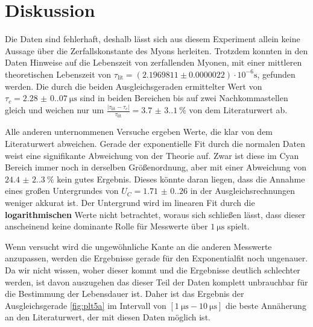 \section{Diskussion}
Die Daten sind fehlerhaft, deshalb lässt sich aus diesem Experiment allein keine Aussage über die Zerfallskonstante des
Myons herleiten. Trotzdem konnten in den Daten Hinweise auf die Lebenszeit von zerfallenden Myonen, 
mit einer mittleren theoretischen Lebenszeit von $\tau_\text{lit} = (2.1969811 \pm0.0000022)\cdot 10^{-6}\unit{\s}$\cite{Workman:2022ynf}, gefunden werden. 
Die durch die beiden Ausgleichsgeraden ermittelter Wert von $\tau_c= \qty{2.28(0.07)}{\us}$ sind in beiden Bereichen bis auf zwei Nachkommastellen gleich und weichen nur um 
$\frac{|\tau_\text{lit} - \tau_c|}{\tau_\text{lit}} = \qty{3.7(3.1)}{\percent}$ von dem Literaturwert ab. 

Alle anderen unternommenen Versuche ergeben Werte, die klar von dem Literaturwert abweichen.
Gerade der exponentielle Fit durch die normalen Daten weist eine signifikante Abweichung von der Theorie auf. 
Zwar ist diese im Cyan Bereich immer noch in derselben Größenordnung, aber mit einer Abweichung von $\qty{24.4(2.3)}{\percent}$ kein gutes Ergebnis.
Dieses könnte daran liegen, dass die Annahme eines großen Untergrundes von $U_C=\num{1.71(0.26)}$ in der Ausgleichsrechnungen weniger akkurat ist.
Der Untergrund wird im linearen Fit durch die \textbf{logarithmischen} Werte nicht betrachtet, woraus sich schließen lässt, 
dass dieser anscheinend keine dominante Rolle für Messwerte über $\qty{1}{\us} $ spielt. 

Wenn versucht wird die ungewöhnliche Kante an die anderen Messwerte anzupassen, werden die Ergebnisse gerade für den Exponentialfit noch ungenauer. 
Da wir nicht wissen, woher dieser kommt und die Ergebnisse deutlich schlechter werden, 
ist davon auszugehen das dieser Teil der Daten komplett unbrauchbar für die Bestimmung der Lebensdauer ist.
Daher ist das Ergebnis der Ausgleichsgerade \eqref{fig:plt5a} im Intervall von $[\qty{1}{\us}-\qty{10}{\us}]$ die beste Annäherung an den Literaturwert, 
der mit diesen Daten möglich ist. 

\newpage
\printbibliography

